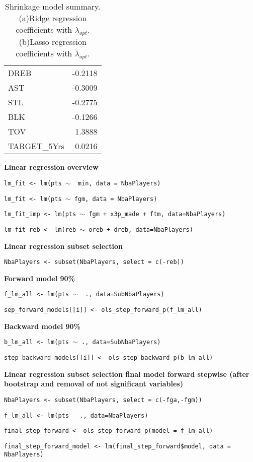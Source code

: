 \begin{table}[H]
\begin{subtable}[h]{0.4\textwidth}
\begin{tabular}{|| l | r ||}
			DREB & -0.2118 \\
			AST & -0.3009 \\
			STL & -0.2775 \\
			BLK & -0.1266 \\
			TOV & 1.3888 \\ 
			TARGET\_5Yrs & 0.0216 \\				
			\hline
		\end{tabular}
		\caption{}
		\label{table:FinalLassoCoef}
	\end{subtable}
	\caption{Shrinkage model summary. (a)Ridge regression coefficients with $\lambda_{opt}$. (b)Lasso regression coefficients with $\lambda_{opt}$.}
	\label{table:RegModSum}
\end{table}

\textbf{Linear regression overview}

\texttt{lm\_fit <- lm(pts $\sim$~ min, data = NbaPlayers)}

\texttt{lm\_fit <- lm(pts $\sim$ fgm, data = NbaPlayers)}

\texttt{lm\_fit\_imp <- lm(pts $\sim$ fgm + x3p\_made + ftm, data=NbaPlayers)}

\texttt{lm\_fit\_reb <- lm(reb $\sim$ oreb + dreb, data=NbaPlayers)}

\noindent
\textbf{Linear regression subset selection}

\texttt{NbaPlayers <- subset(NbaPlayers, select = c(-reb))}

\textbf{Forward model 90\%}

\texttt{f\_lm\_all <- lm(pts $\sim$~ ., data=SubNbaPlayers)}

\texttt{sep\_forward\_models[[i]] <- ols\_step\_forward\_p(f\_lm\_all)}

\textbf{Backward model 90\%}

\texttt{b\_lm\_all <- lm(pts $\sim$ ., data=SubNbaPlayers)}

\texttt{step\_backward\_models[[i]] <- ols\_step\_backward\_p(b\_lm\_all)}

\noindent
\textbf{Linear regression subset selection final model forward stepwise (after bootstrap and removal of not significant variables)}

\texttt{NbaPlayers <- subset(NbaPlayers, select = c(-fga,-fgm))}

\texttt{f\_lm\_all <- lm(pts ~ ., data=NbaPlayers)}

\texttt{final\_step\_forward <- ols\_step\_forward\_p(model = f\_lm\_all)}

\texttt{final\_step\_forward\_model <- lm(final\_step\_forward\$model, data = NbaPlayers)}

